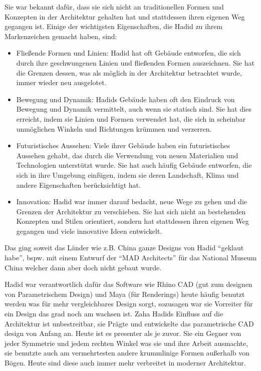 \documentclass[a4paper, 12p]{article}
\begin{document}
Sie war bekannt dafür, dass sie sich nicht an traditionellen Formen und
Konzepten in der Architektur gehalten hat und stattdessen ihren eigenen Weg
gegangen ist. Einige der wichtigsten Eigenschaften, die Hadid zu ihrem
Markenzeichen gemacht haben, sind:

\begin{itemize}
\item Fließende Formen und Linien: Hadid hat oft Gebäude entworfen, die sich
	durch ihre geschwungenen Linien und fließenden Formen auszeichnen. Sie hat die
	Grenzen dessen, was als möglich in der Architektur betrachtet wurde, immer
	wieder neu ausgelotet.
\item Bewegung und Dynamik: Hadids Gebäude haben oft den Eindruck von Bewegung
	und Dynamik vermittelt, auch wenn sie statisch sind. Sie hat dies erreicht,
	indem sie Linien und Formen verwendet hat, die sich in scheinbar unmöglichen
	Winkeln und Richtungen krümmen und verzerren.
\item Futuristisches Aussehen: Viele ihrer Gebäude haben ein futuristisches
	Aussehen gehabt, das durch die Verwendung von neuen Materialien und
	Technologien unterstützt wurde. Sie hat auch häufig Gebäude entworfen, die
	sich in ihre Umgebung einfügen, indem sie deren Landschaft, Klima und andere
	Eigenschaften berücksichtigt hat.
\item Innovation: Hadid war immer darauf bedacht, neue Wege zu gehen und die
	Grenzen der Architektur zu verschieben. Sie hat sich nicht an bestehenden
	Konzepten und Stilen orientiert, sondern hat stattdessen ihren eigenen Weg
	gegangen und viele innovative Ideen entwickelt.
\end{itemize}

Das ging soweit das Länder wie z.B. China ganze Designs von Hadid ``geklaut
habe'', bspw. mit einem Entwurf der ``MAD Architects'' für das National Museum
China welcher dann aber doch nicht gebaut wurde. 

Hadid war verantwortlich dafür das Software wie Rhino CAD (gut zum designen von
Parametrischem Design) und Maya (für Renderings) heute häufig benutzt werden
was für mehr vergleichbares Design sorgt, sozusagen war sie Vorreiter für ein
Design das grad noch am wachsen ist. Zaha Hadids Einfluss auf die Architektur
ist unbestreitbar, sie Prägte und entwickelte das parametrische CAD design von
Anfang an. Heute ist es presenter als je zuvor. Sie ein Gegner von jeder
Symmetrie und jedem rechten Winkel was
sie und ihre Arbeit ausmachte, sie benutzte auch am vermehrtesten andere
krummlinige Formen außerhalb von Bögen. Heute sind diese auch immer mehr
verbreitet in moderner Architektur. 
\end{document}
